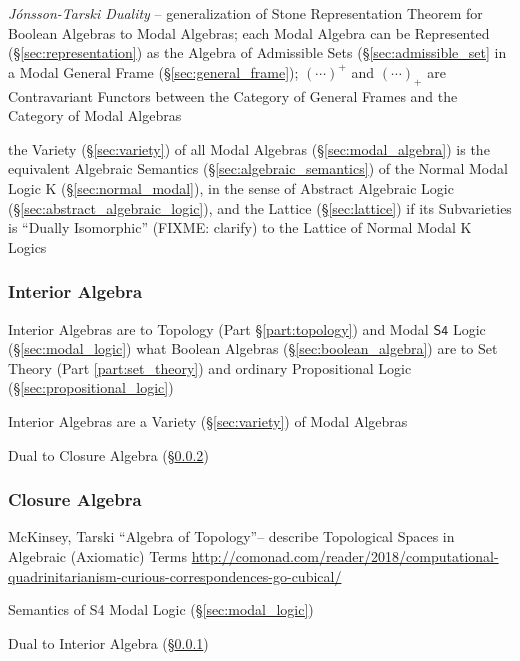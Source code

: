 \emph{J\'onsson-Tarski Duality} -- generalization of Stone Representation
Theorem for Boolean Algebras to Modal Algebras; each Modal Algebra can be
Represented (\S\ref{sec:representation}) as the Algebra of Admissible Sets
(\S\ref{sec:admissible_set} in a Modal General Frame
(\S\ref{sec:general_frame}); $(\cdots)^+$ and $(\cdots)_+$ are Contravariant
Functors between the Category of General Frames and the Category of Modal
Algebras

the Variety (\S\ref{sec:variety}) of all Modal Algebras
(\S\ref{sec:modal_algebra}) is the equivalent Algebraic Semantics
(\S\ref{sec:algebraic_semantics}) of the Normal Modal Logic $\mathrm{K}$
(\S\ref{sec:normal_modal}), in the sense of Abstract Algebraic Logic
(\S\ref{sec:abstract_algebraic_logic}), and the Lattice (\S\ref{sec:lattice}) if
its Subvarieties is ``Dually Isomorphic'' (FIXME: clarify) to the Lattice of
Normal Modal $\mathrm{K}$ Logics



\subsubsection{Interior Algebra}\label{sec:interior_algebra}

Interior Algebras are to Topology (Part \S\ref{part:topology}) and Modal
$\mathsf{S4}$ Logic (\S\ref{sec:modal_logic}) what Boolean Algebras
(\S\ref{sec:boolean_algebra}) are to Set Theory (Part \ref{part:set_theory}) and
ordinary Propositional Logic (\S\ref{sec:propositional_logic})

Interior Algebras are a Variety (\S\ref{sec:variety}) of Modal Algebras

Dual to Closure Algebra (\S\ref{sec:closure_algebra})



\subsubsection{Closure Algebra}\label{sec:closure_algebra}

McKinsey, Tarski ``Algebra of Topology''-- describe Topological Spaces in
Algebraic (Axiomatic) Terms
\url{http://comonad.com/reader/2018/computational-quadrinitarianism-curious-correspondences-go-cubical/}

Semantics of S4 Modal Logic (\S\ref{sec:modal_logic})

Dual to Interior Algebra (\S\ref{sec:interior_algebra})



